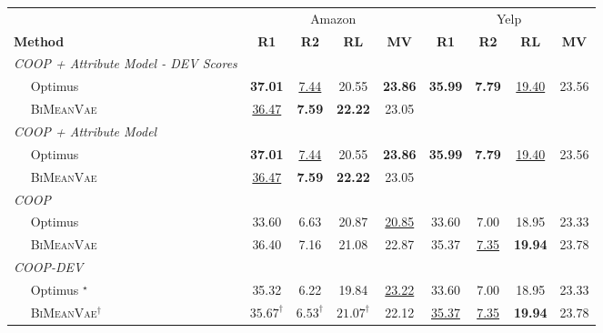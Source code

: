 \begin{table}[!h]
    \label{eval_results}
    \centering
    \begin{tabular}{@{}lcccccccc@{}}
    \toprule
                               & \multicolumn{4}{c}{Amazon} & \multicolumn{4}{c}{Yelp} \\ 
    \textbf{Method} & \textbf{R1} & \textbf{R2} & \textbf{RL} & \textbf{MV} & \textbf{R1} & \textbf{R2} & \textbf{RL} & \textbf{MV}\\ \midrule
    \textit{COOP + Attribute Model - DEV Scores}        &         &         &        &        &        &   & &     \\
    $\quad$ Optimus            &     \textbf{37.01}    &   \underline{7.44}  &  20.55  & \textbf{23.86} &   \textbf{35.99}   &   \textbf{7.79}       & \underline{19.40}   &   23.56 \\ 
    $\quad$ \textsc{BiMeanVae}   &   \underline{36.47}   &   \textbf{7.59}    &   \textbf{22.22}  & 23.05 &     &      &   &    \\ \midrule
    
    \textit{COOP + Attribute Model}        &         &         &        &        &        &   & &     \\
    $\quad$ Optimus            &     \textbf{37.01}    &   \underline{7.44}  &  20.55  & \textbf{23.86} &   \textbf{35.99}   &   \textbf{7.79}       & \underline{19.40}   &   23.56 \\ 
    $\quad$ \textsc{BiMeanVae}   &   \underline{36.47}   &   \textbf{7.59}    &   \textbf{22.22}  & 23.05 &     &      &   &    \\ \midrule
    

    \textit{COOP}              &         &         &        &        &        & &   &    \\
    $\quad$ Optimus           & 33.60  & 6.63    & 20.87 & \underline{20.85} & 33.60  & 7.00   & 18.95 & 23.33\\ 
    $\quad$ \textsc{BiMeanVae}  & 36.40 &  7.16 &  21.08 & 22.87 & 35.37  & \underline{7.35}  & \textbf{19.94} & 23.78\\ \midrule
    
    \textit{COOP-DEV}              &         &         &        &        &        & &   &    \\
    $\quad$ Optimus $^{\star}$           & 35.32   & 6.22    & 19.84 & \underline{23.22} & 33.60  & 7.00   & 18.95 & 23.33\\ 
    $\quad$ \textsc{BiMeanVae}$^{\dagger}$  & $\text{35.67}^{\dagger}$    & $\text{6.53}^{\dagger}$   & \underline{$\text{21.07}^{\dagger}$} & 22.12 & \underline{35.37}  & \underline{7.35}  & \textbf{19.94} & 23.78\\ \midrule
    


\end{tabular}
\end{table}
